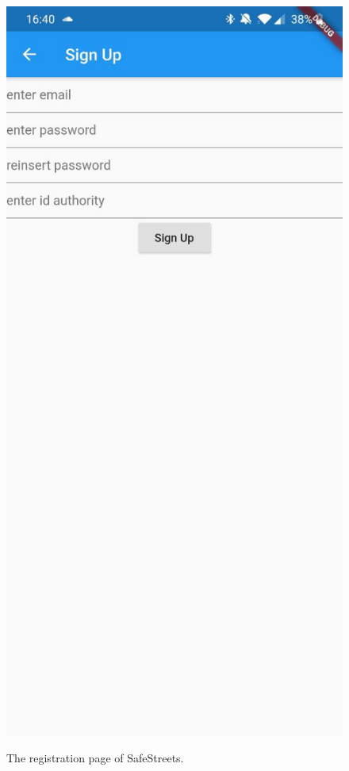 \documentclass[../RASD.tex]{subfiles}
\begin{document}
    \begin{figure}[H]
        \centering
        \includegraphics[scale = 0.2]{assets/app_screenshots/signup.jpg}\\[1.6 cm]
        \caption[\textit{Sign Up} Screenshot]{The registration page of SafeStreets.}
    \end{figure}
\end{document}

